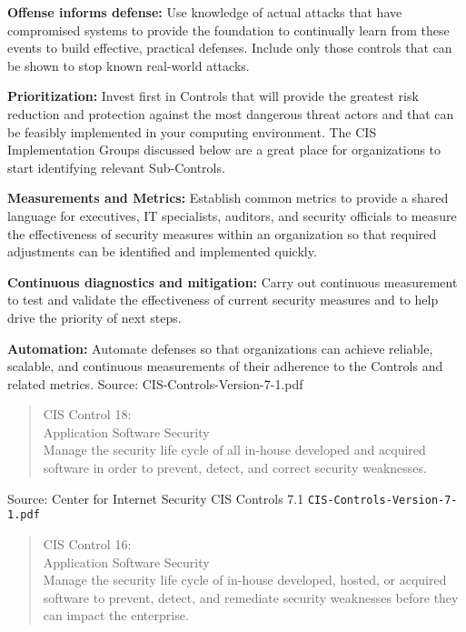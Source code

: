\documentclass[Screen16to9,17pt]{foils}
\begin{document}
\begin{list2}
\item {\bf Offense informs defense:} Use knowledge of actual attacks that have
compromised systems to provide the foundation to continually learn
from these events to build effective, practical defenses. Include only
those controls that can be shown to stop known real-world attacks.
\item {\bf Prioritization:} Invest first in Controls that will provide the greatest risk
reduction and protection against the most dangerous threat actors
and that can be feasibly implemented in your computing environment.
The CIS Implementation Groups discussed below are a great place for
organizations to start identifying relevant Sub-Controls.
\item {\bf Measurements and Metrics:} Establish common metrics to provide a
shared language for executives, IT specialists, auditors, and security
officials to measure the effectiveness of security measures within
an organization so that required adjustments can be identified and
implemented quickly.
\item {\bf Continuous diagnostics and mitigation:} Carry out continuous
measurement to test and validate the effectiveness of current security
measures and to help drive the priority of next steps.
\item {\bf Automation:} Automate defenses so that organizations can achieve
reliable, scalable, and continuous measurements of their adherence to
the Controls and related metrics. \hskip 2cm Source: CIS-Controls-Version-7-1.pdf
\end{list2}



\begin{quote}
CIS Control 18:\\
Application Software Security\\
Manage the security life cycle of all in-house developed and acquired software in order to prevent, detect, and correct security weaknesses.
\end{quote}

Source: Center for Internet Security CIS Controls 7.1 \verb+CIS-Controls-Version-7-1.pdf+

\begin{quote}
CIS Control 16:\\
Application Software Security\\
Manage the security life cycle of in-house developed, hosted,
or acquired software to prevent, detect, and remediate security
weaknesses before they can impact the enterprise.
\end{quote}
\end{document}
